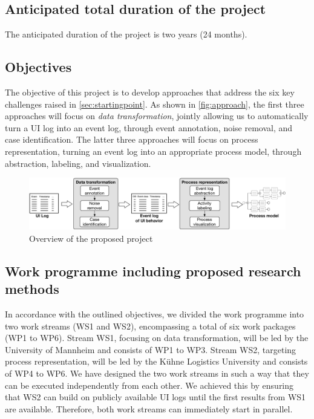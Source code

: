 \subsection{Anticipated total duration of the project}

The anticipated duration of the project is two years (24 months).

\vspace{-1em}
\subsection{Objectives}
\label{sec:objectives}

The objective of this project is to develop approaches that address the six key challenges raised in \autoref{sec:startingpoint}. As shown in \autoref{fig:approach}, the first three approaches will 
focus on \emph{data transformation}, jointly allowing us to automatically turn a UI log into an event log, through event annotation, noise removal, and case identification. The latter three approaches will focus on process representation, turning an event log into an appropriate process model, through  abstraction, labeling, and visualization.

\begin{figure}[h!]
	\centering
	\includegraphics[width=\textwidth]{./figures/overview.pdf}
	\caption{Overview of the proposed project}
	\label{fig:approach}
\end{figure}

\subsection{Work programme including proposed research methods}
\label{sec:workprogramme}

 In accordance with the outlined objectives, we divided the work programme into two work streams (WS1 and WS2), encompassing a total of six work packages (WP1 to WP6). Stream WS1, focusing on data transformation, will be led by the University of Mannheim and consists of WP1 to WP3. Stream WS2, targeting process representation, will be led by the Kühne Logistics University and consists of WP4 to WP6. We have designed the two work streams in such a way that they can be executed independently from each other. We achieved this by ensuring that WS2 can build on publicly available  UI logs until the first results from WS1 are available. Therefore, both work streams can immediately start in parallel. 

